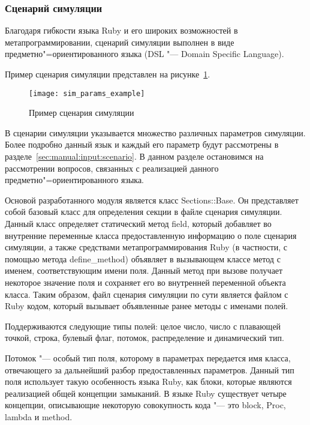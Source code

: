 \subsubsection{Сценарий симуляции}
\label{sec:development:preprocessor:scenario_dsl}

Благодаря гибкости языка Ruby и его широких возможностей в метапрограммировании,
сценарий симуляции выполнен в виде предметно"=ориентированного языка (DSL "--- Domain Specific Language).

Пример сценария симуляции представлен на рисунке~\ref{sec:development:preprocessor:scenario_dsl_listing}.

\begin{figure}[ht!]
  \centering
  \texttt{[image: sim\_params\_example]}
  \caption{Пример сценария симуляции}
  \label{sec:development:preprocessor:scenario_dsl_listing}
\end{figure}

В сценарии симуляции указывается множество различных параметров симуляции.
Более подробно данный язык и каждый его параметр будут рассмотрены в разделе~\ref{sec:manual:input:scenario}.
В данном разделе остановимся на рассмотрении вопросов, связанных с реализацией данного предметно"=ориентированного языка.

Основой разработанного модуля является класс Sections::Base. Он представляет собой базовый класс для определения секции в файле сценария симуляции.
Данный класс определяет статический метод field, который добавляет во внутренние переменные класса предоставленную информацию о поле сценария симуляции,
а также средствами метапрограммирования Ruby (в частности, с помощью метода define\_method) объявляет в вызывающем классе метод с именем, соответствующим имени поля.
Данный метод при вызове получает некоторое значение поля и сохраняет его во внутренней переменной объекта класса.
Таким образом, файл сценария симуляции по сути является файлом с Ruby кодом, который вызывает объявленные ранее методы с именами полей.

Поддерживаются следующие типы полей: целое число, число с плавающей точкой, строка, булевый флаг, потомок, распределение и динамический тип.

Потомок "--- особый тип поля, которому в параметрах передается имя класса, отвечающего за дальнейший разбор предоставленных параметров.
Данный тип поля использует такую особенность языка Ruby, как блоки, которые являются реализацией общей концепции замыканий.
В языке Ruby существует четыре концепции, описывающие некоторую совокупность кода "--- это block, Proc, lambda и method.

